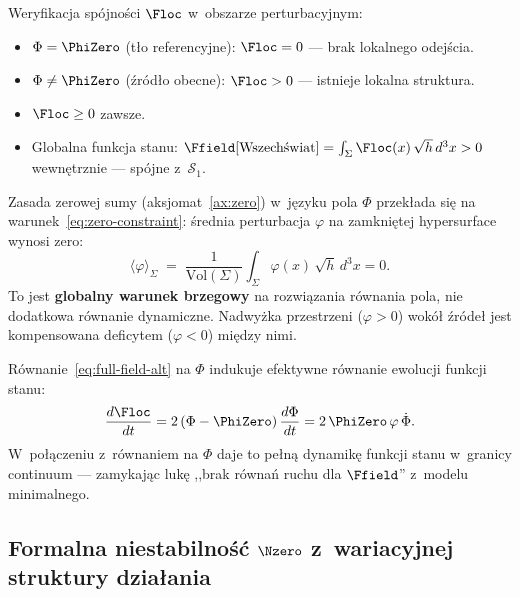 Weryfikacja sp\'ojno\'sci $\Floc$ w~obszarze perturbacyjnym:
\begin{itemize}[nosep]
  \item $\Phi = \PhiZero$ (t\l{}o referencyjne):
    $\Floc = 0$ --- brak lokalnego odej\'scia. \checkmark
  \item $\Phi \neq \PhiZero$ (\'zr\'od\l{}o obecne):
    $\Floc > 0$ --- istnieje lokalna struktura. \checkmark
  \item $\Floc \geq 0$ zawsze. \checkmark
  \item Globalna funkcja stanu: $\Ffield[\text{Wszech\'swiat}]
    = \int_\Sigma \Floc(x)\,\sqrt{h}\,d^3x > 0$
    wewn\k{e}trznie --- sp\'ojne z~$\mathcal{S}_1$. \checkmark
\end{itemize}

\begin{proposition}\label{prop:zero-phi}
Zasada zerowej sumy (aksjomat~\ref{ax:zero}) w~j\k{e}zyku
pola $\Phi$ przek\l{}ada si\k{e} na warunek~\eqref{eq:zero-constraint}:
\'srednia perturbacja $\varphi$ na zamkni\k{e}tej hypersurface
wynosi zero:
\begin{equation}
    \langle\varphi\rangle_\Sigma
    \;=\; \frac{1}{\mathrm{Vol}(\Sigma)}
    \int_\Sigma \varphi(x)\,\sqrt{h}\,d^3x = 0.
\end{equation}
To jest \textbf{globalny warunek brzegowy} na rozwi\k{a}zania
r\'ownania pola, nie dodatkowa r\'ownanie dynamiczne.
Nadwy\.zka przestrzeni ($\varphi > 0$) wok\'o\l{} \'zr\'ode\l{}
jest kompensowana deficytem ($\varphi < 0$) mi\k{e}dzy nimi.
\end{proposition}

\begin{remark}
R\'ownanie~\eqref{eq:full-field-alt} na $\Phi$ indukuje
efektywne r\'ownanie ewolucji funkcji stanu:
\begin{equation}\label{eq:F-evolution}
    \frac{d\Floc}{dt} = 2\,(\Phi - \PhiZero)\,\frac{d\Phi}{dt}
    = 2\,\PhiZero\,\varphi\,\dot{\Phi}.
\end{equation}
W~po\l{}\k{a}czeniu z~r\'ownaniem na $\Phi$ daje to pe\l{}n\k{a}
dynamik\k{e} funkcji stanu w~granicy continuum ---
zamykaj\k{a}c luk\k{e} ,,brak r\'owna\'n ruchu dla $\Ffield$''
z~modelu minimalnego.
\end{remark}

\subsection{Formalna niestabilno\'s\'c $\Nzero$
  z~wariacyjnej struktury dzia\l{}ania}\label{ssec:N0-variational}

